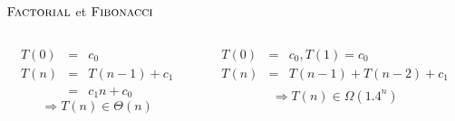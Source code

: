 \begin{frame}{$\textnormal{\scshape Factorial}$ et $\textnormal{\scshape Fibonacci}$}

\begin{columns}
\begin{column}{5.5cm}
\begin{center}\footnotesize
\end{center}
{\footnotesize
\begin{eqnarray*}
T(0) & = & c_0\\
T(n) & = & T(n-1)+c_1\\
     & = & c_1 n+c_0
\end{eqnarray*}
$$\Rightarrow T(n)\in \Theta(n)$$
}
\end{column}
\begin{column}{5.5cm}
\begin{center}\footnotesize
\end{center}
{\footnotesize
\begin{eqnarray*}
T(0) & = & c_0, T(1)= c_0\\
T(n) & = & T(n-1)+T(n-2)+c_1\\
\end{eqnarray*}
}
$$\Rightarrow T(n)\in \Omega(1.4^n)$$
\end{column}
\end{columns}
\end{frame}


